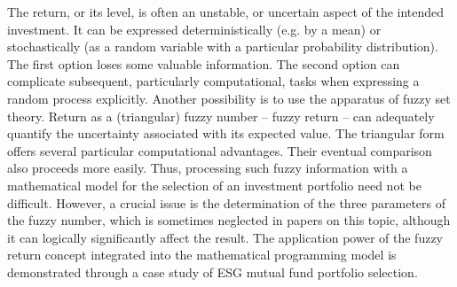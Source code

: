 
\begin{Abstrakt}
    The return, or its level, is often an unstable, or uncertain aspect of the intended investment. It can be expressed deterministically (e.g. by a mean) or stochastically (as a random variable with a particular probability distribution). The first option loses some valuable information. The second option can complicate subsequent, particularly computational, tasks when expressing a random process explicitly. Another possibility is to use the apparatus of fuzzy set theory. Return as a (triangular) fuzzy number – fuzzy return – can adequately quantify the uncertainty associated with its expected value. The triangular form offers several particular computational advantages. Their eventual comparison also proceeds more easily. Thus, processing such fuzzy information with a mathematical model for the selection of an investment portfolio need not be difficult. However, a crucial issue is the determination of the three parameters of the fuzzy number, which is sometimes neglected in papers on this topic, although it can logically significantly affect the result. The application power of the fuzzy return concept integrated into the mathematical programming model is demonstrated through a case study of ESG mutual fund portfolio selection.
\end{Abstrakt}



\clearpage